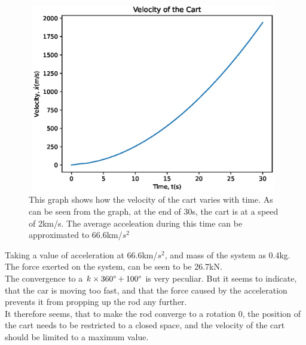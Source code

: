 \documentclass[a4paper,10pt,reqno]{article}
\numberwithin{equation}{section}
\begin{document}
\begin{figure}[H]
\centering
\includegraphics[width=11cm, height=8.25cm]{Q6_vel.eps}
\caption
{This graph shows how the velocity of the cart varies with time. As can be seen from the graph, at the end of 30s, the cart is at a speed of 2km/s. The average acceleation during this time can be approximated to 66.6km/$s^2$}
\end{figure}

\noindent
Taking a value of acceleration at 66.6km/$s^2$, and mass of the system as 0.4kg. The force exerted on the system, can be seen to be 26.7kN.\\

\noindent
The convergence to a $k \times 360\degree + 100\degree$ is very peculiar. But it seems to indicate, that the car is moving too fast, and that the force caused by the acceleration prevents it from propping up the rod any further.\\

\noindent
It therefore seems, that to make the rod converge to a rotation 0\degree, the position of the cart needs to be restricted to a closed space, and the velocity of the cart should be limited to a maximum value.
\end{document}
